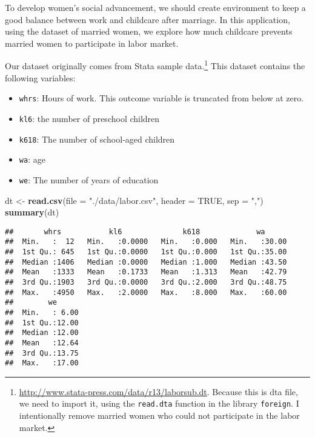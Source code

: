 \documentclass[
  12pt,
]{article}
\newenvironment{Shaded}{\begin{snugshade}}{\end{snugshade}}
\newcommand{\DataTypeTok}[1]{\textcolor[rgb]{0.13,0.29,0.53}{#1}}
\newcommand{\KeywordTok}[1]{\textcolor[rgb]{0.13,0.29,0.53}{\textbf{#1}}}
\newcommand{\NormalTok}[1]{#1}
\newcommand{\OtherTok}[1]{\textcolor[rgb]{0.56,0.35,0.01}{#1}}
\newcommand{\StringTok}[1]{\textcolor[rgb]{0.31,0.60,0.02}{#1}}
\providecommand{\tightlist}{%
  \setlength{\itemsep}{0pt}\setlength{\parskip}{0pt}}
\begin{document}
To develop women's social advancement,
we should create environment to keep a good balance between work and childcare after marriage.
In this application, using the dataset of married women,
we explore how much childcare prevents married women to participate in labor market.

Our dataset originally comes from Stata sample data.\footnote{\url{http://www.stata-press.com/data/r13/laborsub.dt}. Because this is dta file, we need to import it, using the \texttt{read.dta} function in the library \texttt{foreign}. I intentionally remove married women who could not participate in the labor market.}
This dataset contains the following variables:

\begin{itemize}
\tightlist
\item
  \texttt{whrs}: Hours of work. This outcome variable is truncated from below at zero.
\item
  \texttt{kl6}: the number of preschool children
\item
  \texttt{k618}: The number of school‐aged children
\item
  \texttt{wa}: age
\item
  \texttt{we}: The number of years of education
\end{itemize}

\begin{Shaded}
\begin{Highlighting}[]
\NormalTok{dt \textless{}{-}}\StringTok{ }\KeywordTok{read.csv}\NormalTok{(}\DataTypeTok{file =} \StringTok{"./data/labor.csv"}\NormalTok{, }\DataTypeTok{header =} \OtherTok{TRUE}\NormalTok{,  }\DataTypeTok{sep =} \StringTok{","}\NormalTok{)}
\KeywordTok{summary}\NormalTok{(dt)}
\end{Highlighting}
\end{Shaded}

\begin{verbatim}
##       whrs           kl6              k618             wa       
##  Min.   :  12   Min.   :0.0000   Min.   :0.000   Min.   :30.00  
##  1st Qu.: 645   1st Qu.:0.0000   1st Qu.:0.000   1st Qu.:35.00  
##  Median :1406   Median :0.0000   Median :1.000   Median :43.50  
##  Mean   :1333   Mean   :0.1733   Mean   :1.313   Mean   :42.79  
##  3rd Qu.:1903   3rd Qu.:0.0000   3rd Qu.:2.000   3rd Qu.:48.75  
##  Max.   :4950   Max.   :2.0000   Max.   :8.000   Max.   :60.00  
##        we       
##  Min.   : 6.00  
##  1st Qu.:12.00  
##  Median :12.00  
##  Mean   :12.64  
##  3rd Qu.:13.75  
##  Max.   :17.00
\end{verbatim}
\end{document}
